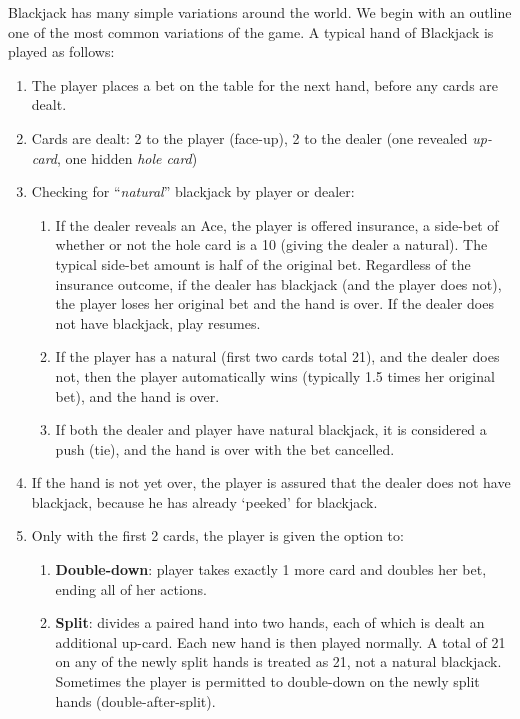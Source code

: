 Blackjack has many simple variations around the world.
We begin with an outline one of the most common variations of the game.
A typical hand of Blackjack is played as follows:

\begin{enumerate}
\item The player places a bet on the table for the next hand, 
before any cards are dealt.
\item Cards are dealt: 2 to the player (face-up), 
2 to the dealer (one revealed \emph{up-card}, one hidden \emph{hole card})
\item Checking for ``\emph{natural}'' blackjack by player or 
dealer:
\begin{enumerate}
\item If the dealer reveals an Ace, the player is offered 
insurance,
a side-bet of whether or not the hole card is a 10 
(giving the dealer a natural).
The typical side-bet amount is half of the original bet.
Regardless of the insurance outcome, 
if the dealer has blackjack (and the player does not),
the player loses her original bet and the hand is over.
If the dealer does not have blackjack, play resumes.  
\item If the player has a natural (first two cards total 21), 
and the dealer does not, then the player automatically wins
(typically 1.5 times her original bet), and the hand is over.
\item If both the dealer and player have natural blackjack, 
it is considered a push (tie), 
and the hand is over with the bet cancelled.  
\end{enumerate}
\item If the hand is not yet over, 
the player is assured that the dealer does not have blackjack, 
because he has already `peeked' for blackjack.
\item Only with the first 2 cards, the player is given the option to:
\begin{enumerate}
\item \textbf{Double-down}: player takes exactly 1 more card 
and doubles her bet, ending all of her actions.
\item \textbf{Split}: divides a paired hand into two hands, 
each of which is dealt an additional up-card.  
Each new hand is then played normally.
A total of 21 on any of the newly split hands is treated as 21, 
not a natural blackjack.
Sometimes the player is permitted to double-down on the newly 
split hands (double-after-split).

\end{enumerate}
\end{enumerate}
